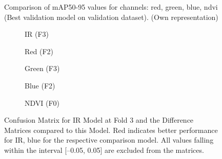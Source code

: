 \begin{figure}[htbp]
    \centering
    
    \caption[Comparison of \acrshort{mAP}50-95 values for channels: red, green, blue, ndvi (Best validation model on validation dataset)]{Comparison of \acrshort{mAP}50-95 values for channels: red, green, blue, ndvi (Best validation model on validation dataset). (Own representation)}
    \label{fig:ablation_map50-95:val_on_val}
\end{figure}

\begin{figure}[htbp]
    \centering
       
    \begin{subfigure}{0.48\textwidth}
        \centering
        
        \caption{IR (F3)}
        \label{fig:ablation_confM_IR_f0}
    \end{subfigure}

    \begin{subfigure}{0.48\textwidth}
        \centering
        
        \caption{Red (F2)}
        \label{fig:ablation_diffM_r_f2}
    \end{subfigure}
    \begin{subfigure}{0.48\textwidth}
        \centering
        
        \caption{Green (F3)}
        \label{fig:ablation_diffM_g_f3}
    \end{subfigure}
    
    \begin{subfigure}{0.48\textwidth}
        \centering
        
        \caption{Blue (F2)}
        \label{fig:ablation_diffM_b_f2}
    \end{subfigure}
    \begin{subfigure}{0.48\textwidth}
        \centering
        
        \caption{NDVI (F0)}
        \label{fig:ablation_diffM_NDVI_f0}
    \end{subfigure}
    


    \caption[Confusion Matrix for IR Model at Fold 3 and the Difference Matrices compared to this Model]{Confusion Matrix for IR Model at Fold 3 and the Difference Matrices compared to this Model. Red indicates better performance for IR, blue for the respective comparison model. All values falling within the interval [–0.05, 0.05] are excluded from the matrices.}
    \label{fig:ablation_diffM_all}
\end{figure}


